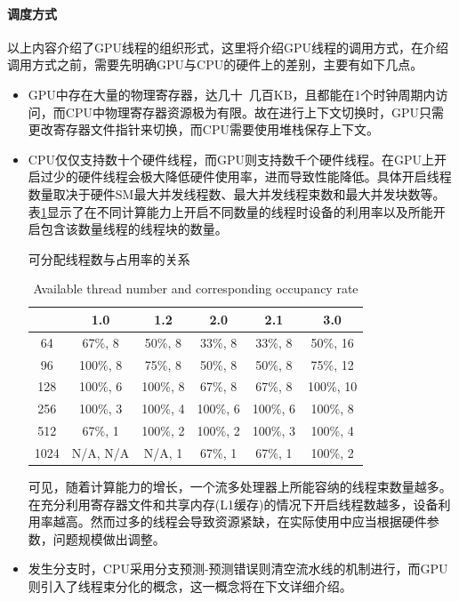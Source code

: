 \paragraph{调度方式}
\par 以上内容介绍了GPU线程的组织形式，这里将介绍GPU线程的调用方式，在介绍调用方式之前，需要先明确GPU与CPU的硬件上的差别，主要有如下几点。
\begin{itemize}
	\item GPU中存在大量的物理寄存器，达几十~几百KB，且都能在1个时钟周期内访问，而CPU中物理寄存器资源极为有限。故在进行上下文切换时，GPU只需更改寄存器文件指针来切换，而CPU需要使用堆栈保存上下文。
	\item CPU仅仅支持数十个硬件线程，而GPU则支持数千个硬件线程。在GPU上开启过少的硬件线程会极大降低硬件使用率，进而导致性能降低。具体开启线程数量取决于硬件SM最大并发线程数、最大并发线程束数和最大并发块数等。表\ref{table-占用率}显示了在不同计算能力上开启不同数量的线程时设备的利用率以及所能开启包含该数量线程的线程块的数量。\\
	\begin{table}
		\centering
		\renewcommand{\thetable}{\arabic{section}-\arabic{table} }
		\renewcommand{\tablename}{表}
		\caption{可分配线程数与占用率的关系}
		\addtocounter{table}{-1}
		\renewcommand{\thetable}{\arabic{section}-\arabic{table} }
		\renewcommand{\tablename}{Table}
		\caption{Available thread number and corresponding occupancy rate}
		\begin{tabular}{cccccc}
			\toprule
			&	1.0	&1.2	&2.0	&2.1	&3.0 \\
			\midrule
			64	&	67\%, 8		&	50\%, 8		&	33\%, 8		&	33\%, 8		&	50\%, 16	\\
			96	&	100\%, 8	&	75\%, 8		&	50\%, 8		&	50\%, 8		&	75\%, 12	\\
			128	&	100\%, 6	&	100\%, 8	&	67\%, 8		&	67\%, 8		&	100\%, 10	\\
			256	&	100\%, 3	&	100\%, 4	&	100\%, 6	&	100\%, 6	&	100\%, 8	\\
			512	&	67\%, 1		&	100\%, 2	&	100\%, 2	&	100\%, 3	&	100\%, 4	\\
			1024&	N/A, N/A	&	N/A, 1		&	67\%, 1		&	67\%, 1		&	100\%, 2	\\
			
			\bottomrule
		\end{tabular} \label{table-占用率}
	\end{table}
	可见，随着计算能力的增长，一个流多处理器上所能容纳的线程束数量越多。在充分利用寄存器文件和共享内存(L1缓存)的情况下开启线程数越多，设备利用率越高。然而过多的线程会导致资源紧缺，在实际使用中应当根据硬件参数，问题规模做出调整。
	\item 发生分支时，CPU采用分支预测-预测错误则清空流水线的机制进行，而GPU则引入了线程束分化的概念，这一概念将在下文详细介绍。
\end{itemize}
